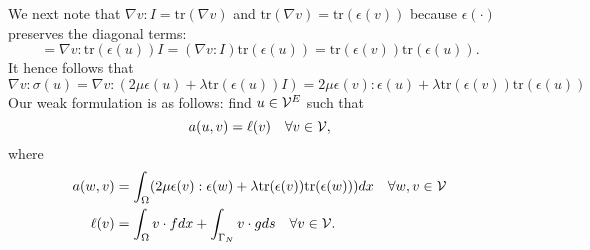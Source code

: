 We next note that $\nabla v: I = \text{tr}(\nabla v)$ and $\text{tr}(\nabla v) = \text{tr}(\epsilon(v))$ because $\epsilon(\cdot)$ preserves the diagonal terms:
\begin{equation*}
  = \nabla v : \text{tr}(\epsilon(u)) I 
  = (\nabla v : I) \text{tr}(\epsilon(u)) 
  = \text{tr}(\epsilon(v)) \text{tr}(\epsilon(u)).
\end{equation*}
It hence follows that
\begin{equation*}
  \nabla v : \sigma(u) = \nabla v : (2 \mu \epsilon(u) + \lambda \text{tr}(\epsilon(u)) I )
  = 2 \mu \epsilon(v) : \epsilon(u) + \lambda \text{tr}(\epsilon(v)) \text{tr}(\epsilon(u))
\end{equation*}
Our weak formulation is as follows: find $u \in \mathcal{V}^E$ such that
\begin{equation}
  a(u,v) = \ell(v) \quad \forall v \in \mathcal{V},
  \label{eq:le_weak}
\end{equation}
where
\begin{align}
  a(w,v) &= \int_{\Omega} ( 2 \mu \epsilon(v) : \epsilon(w) + \lambda \text{tr}(\epsilon(v)) \text{tr}(\epsilon(w)) ) dx \quad \forall w, v \in \mathcal{V} \label{eq:le_a} \\
  \ell(v) &=   \int_{\Omega} v \cdot f dx + \int_{\Gamma_N} v \cdot g ds \quad \forall v \in \mathcal{V} \label{eq:le_ell}.
\end{align}

